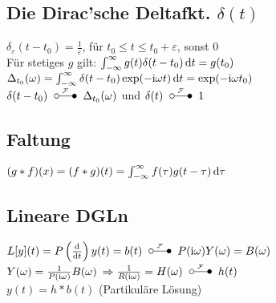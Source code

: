 \documentclass[german,color,5pt]{latex4ei/latex4ei_fs}
\begin{document}
\begin{sectionbox}
	\subsection{Die Dirac'sche Deltafkt. $\delta(t)$}
	$\delta_\varepsilon(t-t_0) = \frac{1}{\varepsilon}$, für $t_0 \le t \le t_0 + \varepsilon$, sonst $0$\\
	Für stetiges $g$ gilt: $\int_{-\infty}^\infty g(t) \delta(t-t_0) \diff t = g(t_0)$\\
	$\Delta_{t_0} (\omega) = \int_{-\infty}^\infty \delta(t-t_0) \exp(-\i \omega t) \diff t = \exp(-\i \omega t_0)$\\
	$\delta(t-t_0) \FT \Delta_{t_0} (\omega)$ und $\delta(t) \FT 1$
	
	
	\subsection{Faltung}
	$(g*f)(x)=(f*g)(t)=\int_{-\infty}^{\infty}f(\tau)g(t-\tau)\diff \tau$
\end{sectionbox}

\begin{sectionbox}
	\subsection{Lineare DGLn}
	$L[y](t) = P\left(\frac{\diff}{\diff t}\right)y(t) = b(t) \FT P(\i \omega)Y(\omega) = B(\omega)$\\
	$Y(\omega) = \frac{1}{P(\mathrm{i} \omega)}B(\omega)$ \qquad  $\Ra\frac{1}{R(\i\omega)} = H(\omega) \FT h(t)$\\
	$y(t) = h*b(t)$ (Partikuläre Lösung)
\end{sectionbox}
\end{document}
